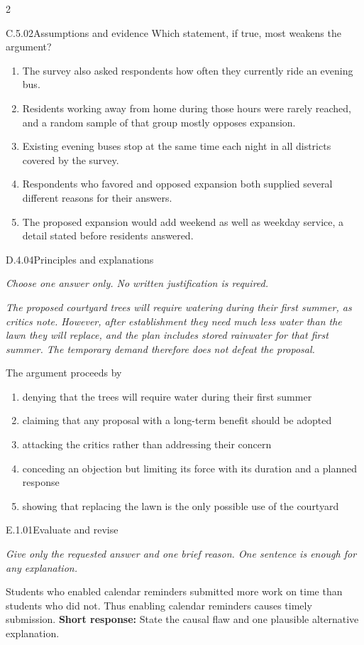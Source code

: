 \documentclass[9pt]{extarticle}
\newcommand{\choice}[1]{\item #1}
\begin{document}
\begin{multicols}{2}
\begin{DenseCoreProblem}{C.5.02}{Assumptions and evidence}
Which statement, if true, most weakens the argument?
\begin{enumerate}[label=(\alph*)]
  \choice{The survey also asked respondents how often they currently ride an evening bus.}
  \choice{Residents working away from home during those hours were rarely reached, and a random sample of that group mostly opposes expansion.}
  \choice{Existing evening buses stop at the same time each night in all districts covered by the survey.}
  \choice{Respondents who favored and opposed expansion both supplied several different reasons for their answers.}
  \choice{The proposed expansion would add weekend as well as weekday service, a detail stated before residents answered.}
\end{enumerate}
\end{DenseCoreProblem}
\begin{DenseCoreProblem}{D.4.04}{Principles and explanations}
{\scriptsize\textit{Choose one answer only. No written justification is required.}\par}
\emph{The proposed courtyard trees will require watering during their first summer, as critics note. However, after establishment they need much less water than the lawn they will replace, and the plan includes stored rainwater for that first summer. The temporary demand therefore does not defeat the proposal.}

The argument proceeds by
\begin{enumerate}[label=(\alph*)]
  \choice{denying that the trees will require water during their first summer}
  \choice{claiming that any proposal with a long-term benefit should be adopted}
  \choice{attacking the critics rather than addressing their concern}
  \choice{conceding an objection but limiting its force with its duration and a planned response}
  \choice{showing that replacing the lawn is the only possible use of the courtyard}
\end{enumerate}
\end{DenseCoreProblem}
\begin{DenseCoreProblem}{E.1.01}{Evaluate and revise}
{\scriptsize\textit{Give only the requested answer and one brief reason. One sentence is enough for any explanation.}\par}
Students who enabled calendar reminders submitted more work on time than students who did not. Thus enabling calendar reminders causes timely submission.
\textbf{Short response:} State the causal flaw and one plausible alternative explanation.
\end{DenseCoreProblem}
\end{multicols}
\end{document}

